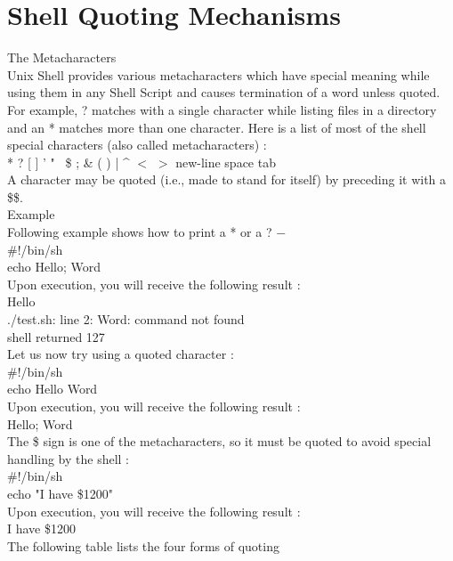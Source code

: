 \documentclass{article}
\begin{document}
\section*{Shell Quoting Mechanisms}
The Metacharacters\\
Unix Shell provides various metacharacters which have special meaning while using them in any Shell Script and causes termination of a word unless quoted.\\
For example, ? matches with a single character while listing files in a directory and an * matches more than one character. Here is a list of most of the shell special characters (also called metacharacters) :\\
* ? [ ] ' " \ \$ ; & ( ) | \^ $<$ $>$ new-line space tab\\
A character may be quoted (i.e., made to stand for itself) by preceding it with a \$\$.\\
Example\\
Following example shows how to print a * or a ? −\\
\#!/bin/sh\\
echo Hello; Word\\
Upon execution, you will receive the following result :\\
Hello\\
./test.sh: line 2: Word: command not found\\
shell returned 127\\
Let us now try using a quoted character :\\
\#!/bin/sh\\
echo Hello\; Word\\
Upon execution, you will receive the following result :\\
Hello; Word\\
The \$ sign is one of the metacharacters, so it must be quoted to avoid special handling by the shell :\\
\#!/bin/sh\\
echo "I have \$1200"\\
Upon execution, you will receive the following result :\\
I have \$1200\\
The following table lists the four forms of quoting 
\end{document}
